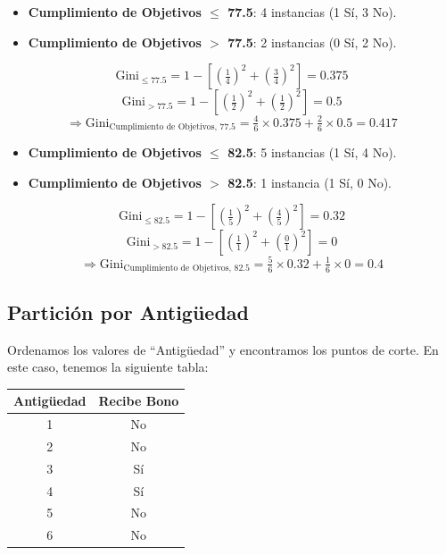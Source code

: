 \documentclass[12pt]{article}
\begin{document}
\begin{itemize}
  \item \textbf{Cumplimiento de Objetivos $\leq$ 77.5}: 4 instancias (1 Sí, 3 No).
  \item \textbf{Cumplimiento de Objetivos $>$ 77.5}: 2 instancias (0 Sí, 2 No).
\end{itemize}
\[
  \mathrm{Gini}_{\le77.5} = 1 - \left[\left(\tfrac{1}{4}\right)^2 + \left(\tfrac{3}{4}\right)^2\right] = 0.375
\]
\[
  \mathrm{Gini}_{>77.5} = 1 - \left[\left(\tfrac{1}{2}\right)^2 + \left(\tfrac{1}{2}\right)^2\right] = 0.5
\]
\[
  \Rightarrow \mathrm{Gini}_{\text{Cumplimiento de Objetivos, 77.5}} = \tfrac{4}{6}\times0.375 + \tfrac{2}{6}\times0.5 = 0.417
\]

\begin{itemize}
  \item \textbf{Cumplimiento de Objetivos $\leq$ 82.5}: 5 instancias (1 Sí, 4 No).
    \item \textbf{Cumplimiento de Objetivos $>$ 82.5}: 1 instancia (1 Sí, 0 No).
  \end{itemize}

  \[
    \mathrm{Gini}_{\le82.5} = 1 - \left[\left(\tfrac{1}{5}\right)^2 + \left(\tfrac{4}{5}\right)^2\right] = 0.32
  \]
  \[
    \mathrm{Gini}_{>82.5} = 1 - \left[\left(\tfrac{1}{1}\right)^2 + \left(\tfrac{0}{1}\right)^2\right] = 0
\]
\[
  \Rightarrow \mathrm{Gini}_{\text{Cumplimiento de Objetivos, 82.5}} = \tfrac{5}{6}\times0.32 + \tfrac{1}{6}\times0 = 0.4
\]

\subsection{Partición por Antigüedad}

Ordenamos los valores de ``Antigüedad'' y encontramos los puntos de corte. En este caso, tenemos la siguiente tabla:

\begin{table}[h]
  \centering
  \begin{tabular}{cc}
    \toprule
    Antigüedad & Recibe Bono \\
    \midrule
    1 & No \\
    2 & No \\
    3 & Sí \\
    4 & Sí \\
    5 & No \\
    6 & No \\
    \bottomrule
  \end{tabular}
\end{table}
\end{document}
